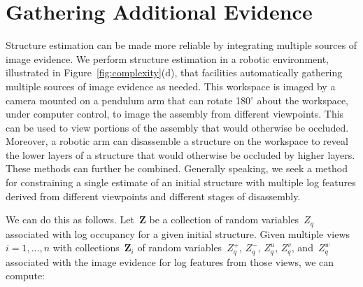 \par\vspace{-1ex}
\section{Gathering Additional Evidence}
\label{sec:integration}

Structure estimation can be made more reliable by integrating multiple sources
of image evidence.
%
We perform structure estimation in a robotic environment, illustrated in
Figure~\ref{fig:complexity}(d), that facilities automatically gathering
multiple sources of image evidence as needed.
%
This workspace is imaged by a camera mounted on a pendulum arm that can rotate
180$^{\circ}$ about the workspace, under computer control, to image the
assembly from different viewpoints.
%
This can be used to view portions of the assembly that would otherwise be
occluded.
%
Moreover, a robotic arm can disassemble a structure on the workspace to reveal
the lower layers of a structure that would otherwise be occluded by higher
layers.
%
These methods can further be combined.
%
Generally speaking, we seek a method for constraining a single estimate
of an initial structure with multiple log features derived from different
viewpoints and different stages of disassembly.

We can do this as follows.
%
Let~$\mathbf{Z}$ be a collection of random variables~$Z_q$ associated with log
occupancy for a given initial structure.
%
Given multiple views $i=1,\ldots,n$ with collections~$\mathbf{Z}_i$ of random
variables~$Z^+_q$, $Z^-_q$, $Z^u_q$, $Z^v_q$, and~$Z^w_q$ associated with the
image evidence for log features from those views, we can compute:

